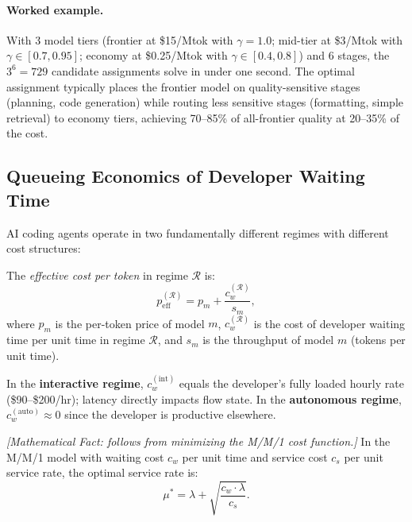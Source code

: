 \paragraph{Worked example.} With 3 model tiers (frontier at \$15/Mtok with $\gamma = 1.0$; mid-tier at \$3/Mtok with $\gamma \in [0.7, 0.95]$; economy at \$0.25/Mtok with $\gamma \in [0.4, 0.8]$) and 6 stages, the $3^6 = 729$ candidate assignments solve in under one second. The optimal assignment typically places the frontier model on quality-sensitive stages (planning, code generation) while routing less sensitive stages (formatting, simple retrieval) to economy tiers, achieving 70--85\% of all-frontier quality at 20--35\% of the cost.

\subsection{Queueing Economics of Developer Waiting Time}

AI coding agents operate in two fundamentally different regimes with different cost structures:

\begin{definition}
\label{def:econ-effective-cost}
The \emph{effective cost per token} in regime $\mathcal{R}$ is:
\begin{equation}\label{eq:econ-effective-cost}
    p_{\text{eff}}^{(\mathcal{R})} = p_m + \frac{c_w^{(\mathcal{R})}}{s_m},
\end{equation}
where $p_m$ is the per-token price of model $m$, $c_w^{(\mathcal{R})}$ is the cost of developer waiting time per unit time in regime $\mathcal{R}$, and $s_m$ is the throughput of model $m$ (tokens per unit time).
\end{definition}

In the \textbf{interactive regime}, $c_w^{(\text{int})}$ equals the developer's fully loaded hourly rate (\$90--\$200/hr); latency directly impacts flow state. In the \textbf{autonomous regime}, $c_w^{(\text{auto})} \approx 0$ since the developer is productive elsewhere.

\begin{proposition}
\label{prop:econ-optimal-mu}
\emph{[Mathematical Fact: follows from minimizing the M/M/1 cost function.]}
In the M/M/1 model with waiting cost $c_w$ per unit time and service cost $c_s$ per unit service rate, the optimal service rate is:
\begin{equation}\label{eq:econ-optimal-mu}
    \mu^* = \lambda + \sqrt{\frac{c_w \cdot \lambda}{c_s}}.
\end{equation}
\end{proposition}

